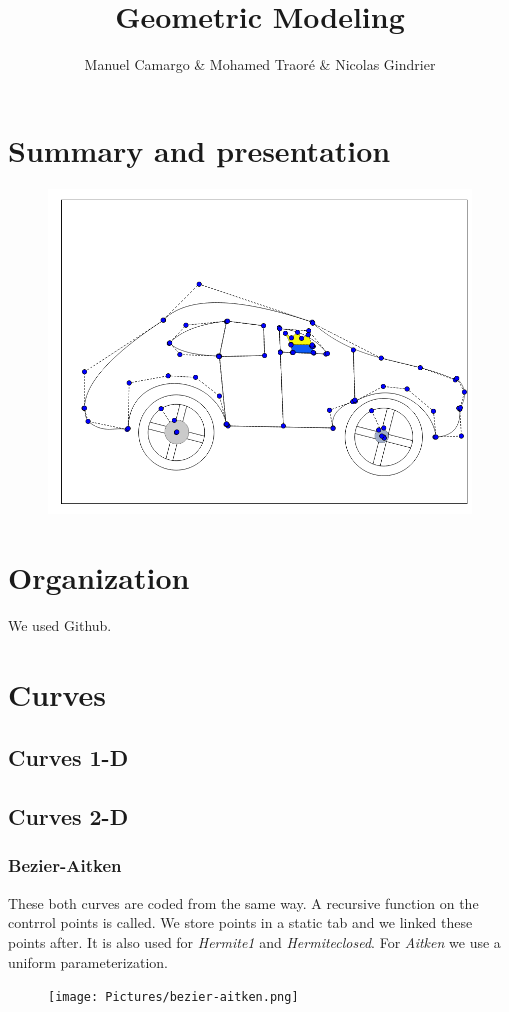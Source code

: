 \documentclass{article}
\title{Geometric Modeling}
\author{Manuel Camargo & Mohamed Traoré &  Nicolas Gindrier}
\date{}
\begin{document}
\maketitle
\section*{Summary and presentation}
\begin{figure}[H]
   \includegraphics[scale = 0.5]{Pictures/narutovoiture.png}
\end{figure}
\section*{Organization}
We used Github.
\section*{Curves}
\subsection*{Curves 1-D}
\subsection*{Curves 2-D}
\subsubsection*{Bezier-Aitken}
These both curves are coded from the same way. A recursive function on the contrrol points is called. We store points in a static tab and we linked these points after. It is also used for \textit{Hermite1} and \textit{Hermiteclosed}. For \textit{Aitken} we use a uniform parameterization. 
\begin{figure}[H]
   \texttt{[image: Pictures/bezier-aitken.png]}
\end{figure}
\end{document}
